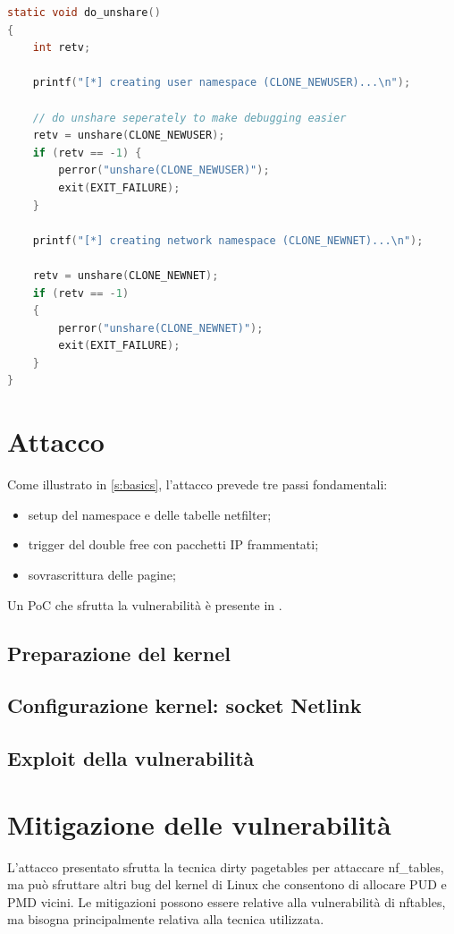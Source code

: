 \documentclass{article}
\begin{document}
\begin{lstlisting}[language=C,style=CStyle,caption="Setup network namespace come utente non privilegiato"]
static void do_unshare()
{
    int retv;

    printf("[*] creating user namespace (CLONE_NEWUSER)...\n");
    
	// do unshare seperately to make debugging easier
    retv = unshare(CLONE_NEWUSER);
	if (retv == -1) {
        perror("unshare(CLONE_NEWUSER)");
        exit(EXIT_FAILURE);
    }

    printf("[*] creating network namespace (CLONE_NEWNET)...\n");

    retv = unshare(CLONE_NEWNET);
    if (retv == -1)
	{
		perror("unshare(CLONE_NEWNET)");
		exit(EXIT_FAILURE);
	}
}
\end{lstlisting}

\clearpage
\section{Attacco}
Come illustrato in \cref{s:basics}, l'attacco prevede tre 
passi fondamentali:
\begin{itemize}
  \item setup del namespace e delle tabelle netfilter;
  \item trigger del double free con pacchetti IP frammentati;
  \item sovrascrittura delle pagine;
\end{itemize}
Un PoC che sfrutta la vulnerabilità è presente in \cite{ExploitPoC}.
\subsection{Preparazione del kernel}

\subsection{Configurazione kernel: socket Netlink}

\subsection{Exploit della vulnerabilità}

\clearpage

\section{Mitigazione delle vulnerabilità}
L'attacco presentato sfrutta la tecnica dirty pagetables per attaccare nf\_tables, ma 
può sfruttare altri bug del kernel di Linux che consentono di allocare PUD e PMD vicini. Le 
mitigazioni possono essere relative alla vulnerabilità di nftables, ma bisogna principalmente
relativa alla tecnica utilizzata.
\end{document}
